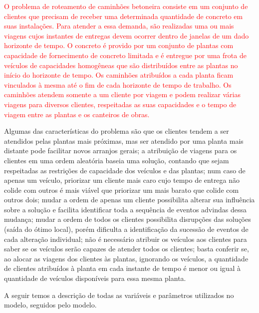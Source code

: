 
\label{sec:model}

\textcolor{red}
{O problema de roteamento de caminhões betoneira consiste em um conjunto de clientes que precisam de receber uma determinada quantidade de concreto em suas instalações. Para atender a essa demanda, são realizadas uma ou mais viagens cujos instantes de entregas devem ocorrer dentro de janelas de um dado horizonte de tempo. O concreto é provido por um conjunto de plantas com capacidade de fornecimento de concreto limitada e é entregue por uma frota de veículos de capacidades homogêneas que são distribuídos entre as plantas no início do horizonte de tempo. Os caminhões atribuídos a cada planta ficam vinculados à mesma  até o fim de cada horizonte de tempo de trabalho. Os caminhões atendem somente a um cliente por viagem e podem realizar várias viagens para diversos clientes, respeitadas as suas capacidades e o tempo de viagem entre as plantas e os canteiros de obras.}

Algumas das características do problema são que os clientes tendem a ser atendidos pelas plantas mais próximas, mas ser atendido por uma planta mais distante pode facilitar novos arranjos gerais; a atribuição de viagens para os clientes em uma ordem aleatória baseia uma solução, contando que sejam respeitadas as restrições de capacidade dos veículos e das plantas; num caso de apenas um veículo, priorizar um cliente mais caro cujo tempo de entrega não colide com outros é mais viável que priorizar um mais barato que colide com outros dois; mudar a ordem de apenas um cliente possibilita alterar sua influência sobre a solução e facilita identificar toda a sequência de eventos advindas dessa mudança; mudar a ordem de todos os clientes possibilita disrupções das soluções (saída do ótimo local), porém dificulta a identificação da sucessão de eventos de cada alteração individual; não é necessário atribuir os veículos aos clientes para saber se os veículos serão capazes de atender todos os clientes; basta conferir se, ao alocar as viagens dos clientes às plantas, ignorando os veículos, a quantidade de clientes atribuídos à planta em cada instante de tempo é menor ou igual à quantidade de veículos disponíveis para essa mesma planta.

A seguir temos a descrição de todas as variáveis e parâmetros utilizados no modelo, seguidos pelo modelo. 


